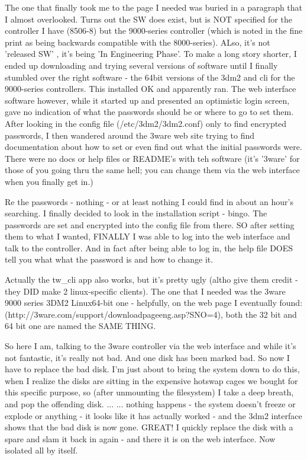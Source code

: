 \documentclass[12pt,twoside]{article}
\begin{document}
The one that finally took me to the page I needed was buried in a paragraph 
that I almost overlooked.  Turns out the SW does exist, but is NOT specified 
for the controller I have (8506-8) but  the 9000-series controller (which is 
noted in the fine print as being backwards compatible with the 8000-series).  
ALso, it's not 'released SW' , it's being 'In Engineering Phase'.  To make a 
long story shorter, I ended up downloading and trying several versions of 
software until I finally stumbled over the right software - the 64bit 
versions of the 3dm2 and cli for the 9000-series controllers.  This installed 
OK and apparently ran.  The web interface software however, while it started 
up and presented an optimistic login screen, gave no indication of what the 
passwords should be or where to go to set them.  After looking in the config 
file (/etc/3dm2/3dm2.conf) only to find encrypted passwords, I then wandered 
around the 3ware web site trying to find documentation about how to set or 
even find out what the initial passwords were. There were no docs or help 
files or README's with teh software (it's '3ware' for those of you going thru 
the same hell; you can change them via the web interface when you finally get 
in.)

Re the passwords - nothing - or at least nothing I could find in about an 
hour's searching.  I finally decided to look in the installation script - 
bingo.  The passwords are set and encrypted into the config file from there.  
SO after setting them to what I wanted, FINALLY I was able to log into the 
web interface and talk to the controller. And in fact after being able to log 
in, the help file DOES tell you what what the password is and how to change 
it.

Actually the tw\_cli app also works, but it's pretty ugly (altho give them 
credit - they DID make 2 linux-specific clients).  The one that I needed was 
the 3ware 9000 series 3DM2 Linux64-bit one - helpfully, on the web page I 
eventually found: (http://3ware.com/support/downloadpageeng.asp?SNO=4), both 
the 32 bit and 64 bit one are named the SAME THING.

So here I am, talking to the 3ware controller via the web interface and while 
it's not fantastic, it's really not bad.  And one disk has been marked bad.  
So now I have to replace the bad disk.  I'm just about to bring the system 
down to do this, when I realize the disks are sitting in the expensive 
hotswap cages we bought for this specific purpose, so (after unmounting the 
filesystem) I take a deep breath, and pop the offending disk. ... ... nothing 
happens - the system doesn't freeze or explode or anything - it looks like it 
has actually worked - and the 3dm2 interface shows that the bad disk is now 
gone.  GREAT!  I quickly replace the disk with a spare and slam it back in 
again - and there it is on the web interface.  Now isolated all by itself. 
\end{document}
